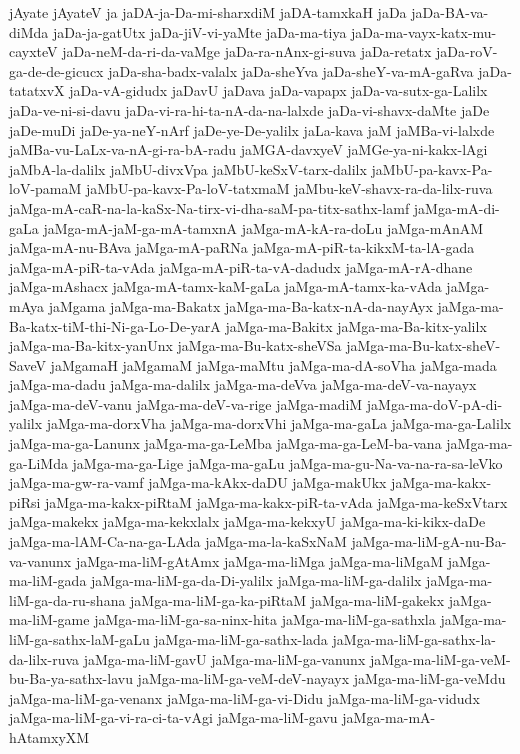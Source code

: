 {jAyate
jAyateV
ja
jaDA-ja-Da-mi-sharxdiM
jaDA-tamxkaH
jaDa
jaDa-BA-va-diMda
jaDa-ja-gatUtx
jaDa-jiV-vi-yaMte
jaDa-ma-tiya
jaDa-ma-vayx-katx-mu-cayxteV
jaDa-neM-da-ri-da-vaMge
jaDa-ra-nAnx-gi-suva
jaDa-retatx
jaDa-roV-ga-de-de-gicucx
jaDa-sha-badx-valalx
jaDa-sheYva
jaDa-sheY-va-mA-gaRva
jaDa-tatatxvX
jaDa-vA-gidudx
jaDavU
jaDava
jaDa-vapapx
jaDa-va-sutx-ga-Lalilx
jaDa-ve-ni-si-davu
jaDa-vi-ra-hi-ta-nA-da-na-lalxde
jaDa-vi-shavx-daMte
jaDe
jaDe-muDi
jaDe-ya-neY-nArf
jaDe-ye-De-yalilx
jaLa-kava
jaM
jaMBa-vi-lalxde
jaMBa-vu-LaLx-va-nA-gi-ra-bA-radu
jaMGA-davxyeV
jaMGe-ya-ni-kakx-lAgi
jaMbA-la-dalilx
jaMbU-divxVpa
jaMbU-keSxV-tarx-dalilx
jaMbU-pa-kavx-Pa-loV-pamaM
jaMbU-pa-kavx-Pa-loV-tatxmaM
jaMbu-keV-shavx-ra-da-lilx-ruva
jaMga-mA-caR-na-la-kaSx-Na-tirx-vi-dha-saM-pa-titx-sathx-lamf
jaMga-mA-di-gaLa
jaMga-mA-jaM-ga-mA-tamxnA
jaMga-mA-kA-ra-doLu
jaMga-mAnAM
jaMga-mA-nu-BAva
jaMga-mA-paRNa
jaMga-mA-piR-ta-kikxM-ta-lA-gada
jaMga-mA-piR-ta-vAda
jaMga-mA-piR-ta-vA-dadudx
jaMga-mA-rA-dhane
jaMga-mAshacx
jaMga-mA-tamx-kaM-gaLa
jaMga-mA-tamx-ka-vAda
jaMga-mAya
jaMgama
jaMga-ma-Bakatx
jaMga-ma-Ba-katx-nA-da-nayAyx
jaMga-ma-Ba-katx-tiM-thi-Ni-ga-Lo-De-yarA
jaMga-ma-Bakitx
jaMga-ma-Ba-kitx-yalilx
jaMga-ma-Ba-kitx-yanUnx
jaMga-ma-Bu-katx-sheVSa
jaMga-ma-Bu-katx-sheV-SaveV
jaMgamaH
jaMgamaM
jaMga-maMtu
jaMga-ma-dA-soVha
jaMga-mada
jaMga-ma-dadu
jaMga-ma-dalilx
jaMga-ma-deVva
jaMga-ma-deV-va-nayayx
jaMga-ma-deV-vanu
jaMga-ma-deV-va-rige
jaMga-madiM
jaMga-ma-doV-pA-di-yalilx
jaMga-ma-dorxVha
jaMga-ma-dorxVhi
jaMga-ma-gaLa
jaMga-ma-ga-Lalilx
jaMga-ma-ga-Lanunx
jaMga-ma-ga-LeMba
jaMga-ma-ga-LeM-ba-vana
jaMga-ma-ga-LiMda
jaMga-ma-ga-Lige
jaMga-ma-gaLu
jaMga-ma-gu-Na-va-na-ra-sa-leVko
jaMga-ma-gw-ra-vamf
jaMga-ma-kAkx-daDU
jaMga-makUkx
jaMga-ma-kakx-piRsi
jaMga-ma-kakx-piRtaM
jaMga-ma-kakx-piR-ta-vAda
jaMga-ma-keSxVtarx
jaMga-makekx
jaMga-ma-kekxlalx
jaMga-ma-kekxyU
jaMga-ma-ki-kikx-daDe
jaMga-ma-lAM-Ca-na-ga-LAda
jaMga-ma-la-kaSxNaM
jaMga-ma-liM-gA-nu-Ba-va-vanunx
jaMga-ma-liM-gAtAmx
jaMga-ma-liMga
jaMga-ma-liMgaM
jaMga-ma-liM-gada
jaMga-ma-liM-ga-da-Di-yalilx
jaMga-ma-liM-ga-dalilx
jaMga-ma-liM-ga-da-ru-shana
jaMga-ma-liM-ga-ka-piRtaM
jaMga-ma-liM-gakekx
jaMga-ma-liM-game
jaMga-ma-liM-ga-sa-ninx-hita
jaMga-ma-liM-ga-sathxla
jaMga-ma-liM-ga-sathx-laM-gaLu
jaMga-ma-liM-ga-sathx-lada
jaMga-ma-liM-ga-sathx-la-da-lilx-ruva
jaMga-ma-liM-gavU
jaMga-ma-liM-ga-vanunx
jaMga-ma-liM-ga-veM-bu-Ba-ya-sathx-lavu
jaMga-ma-liM-ga-veM-deV-nayayx
jaMga-ma-liM-ga-veMdu
jaMga-ma-liM-ga-venanx
jaMga-ma-liM-ga-vi-Didu
jaMga-ma-liM-ga-vidudx
jaMga-ma-liM-ga-vi-ra-ci-ta-vAgi
jaMga-ma-liM-gavu
jaMga-ma-mA-hAtamxyXM
}
